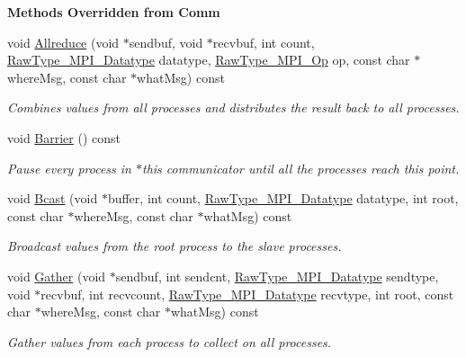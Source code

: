 \begin{Indent}{\bf Methods Overridden from Comm}\par
\begin{DoxyCompactItemize}
\item 
void \hyperlink{class_q_u_e_s_o_1_1_mpi_comm_a72e137e60ef8060efb1ee5fc874fa4b8}{Allreduce} (void $\ast$sendbuf, void $\ast$recvbuf, int count, \hyperlink{namespace_q_u_e_s_o_a8648edf143b92c6f21f6cb93223b2cc9}{Raw\-Type\-\_\-\-M\-P\-I\-\_\-\-Datatype} datatype, \hyperlink{namespace_q_u_e_s_o_ab6a4008f3ba2b0196dae9e41971a9c18}{Raw\-Type\-\_\-\-M\-P\-I\-\_\-\-Op} op, const char $\ast$where\-Msg, const char $\ast$what\-Msg) const 
\begin{DoxyCompactList}\small\item\em Combines values from all processes and distributes the result back to all processes. \end{DoxyCompactList}\item 
void \hyperlink{class_q_u_e_s_o_1_1_mpi_comm_a4059971c30e023b272fccaa6aa00c426}{Barrier} () const 
\begin{DoxyCompactList}\small\item\em Pause every process in $\ast$this communicator until all the processes reach this point. \end{DoxyCompactList}\item 
void \hyperlink{class_q_u_e_s_o_1_1_mpi_comm_abd6af8db8b0c7fd2f5b62e26477a9537}{Bcast} (void $\ast$buffer, int count, \hyperlink{namespace_q_u_e_s_o_a8648edf143b92c6f21f6cb93223b2cc9}{Raw\-Type\-\_\-\-M\-P\-I\-\_\-\-Datatype} datatype, int root, const char $\ast$where\-Msg, const char $\ast$what\-Msg) const 
\begin{DoxyCompactList}\small\item\em Broadcast values from the root process to the slave processes. \end{DoxyCompactList}\item 
void \hyperlink{class_q_u_e_s_o_1_1_mpi_comm_a184a5e411afcfb6dc41e99fca9435045}{Gather} (void $\ast$sendbuf, int sendcnt, \hyperlink{namespace_q_u_e_s_o_a8648edf143b92c6f21f6cb93223b2cc9}{Raw\-Type\-\_\-\-M\-P\-I\-\_\-\-Datatype} sendtype, void $\ast$recvbuf, int recvcount, \hyperlink{namespace_q_u_e_s_o_a8648edf143b92c6f21f6cb93223b2cc9}{Raw\-Type\-\_\-\-M\-P\-I\-\_\-\-Datatype} recvtype, int root, const char $\ast$where\-Msg, const char $\ast$what\-Msg) const 
\begin{DoxyCompactList}\small\item\em Gather values from each process to collect on all processes. \end{DoxyCompactList}\item 

\end{DoxyCompactItemize}
\end{Indent}
